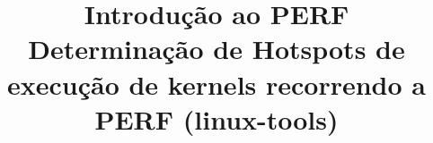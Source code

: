 \documentclass[conference,compsoc]{IEEEtran}
\begin{document}
  \title{Introdução ao PERF\\ Determinação de Hotspots de execução de kernels recorrendo a PERF (linux-tools)}

  \author{
  }


% 




\end{document}
